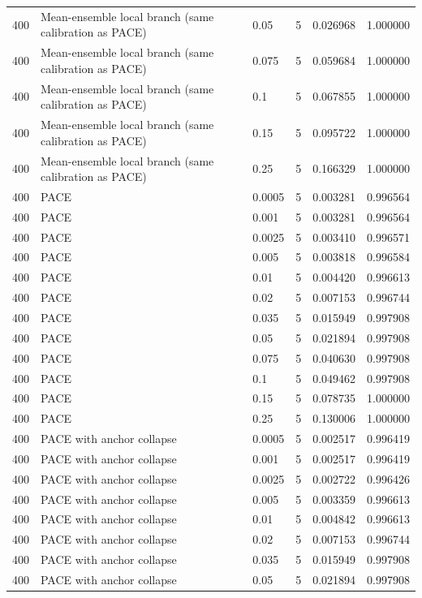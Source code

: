 \begin{tabular}{llllll}
400 & Mean-ensemble local branch (same calibration as PACE) & 0.05 & 5 & 0.026968 & 1.000000 \\
400 & Mean-ensemble local branch (same calibration as PACE) & 0.075 & 5 & 0.059684 & 1.000000 \\
400 & Mean-ensemble local branch (same calibration as PACE) & 0.1 & 5 & 0.067855 & 1.000000 \\
400 & Mean-ensemble local branch (same calibration as PACE) & 0.15 & 5 & 0.095722 & 1.000000 \\
400 & Mean-ensemble local branch (same calibration as PACE) & 0.25 & 5 & 0.166329 & 1.000000 \\
400 & PACE & 0.0005 & 5 & 0.003281 & 0.996564 \\
400 & PACE & 0.001 & 5 & 0.003281 & 0.996564 \\
400 & PACE & 0.0025 & 5 & 0.003410 & 0.996571 \\
400 & PACE & 0.005 & 5 & 0.003818 & 0.996584 \\
400 & PACE & 0.01 & 5 & 0.004420 & 0.996613 \\
400 & PACE & 0.02 & 5 & 0.007153 & 0.996744 \\
400 & PACE & 0.035 & 5 & 0.015949 & 0.997908 \\
400 & PACE & 0.05 & 5 & 0.021894 & 0.997908 \\
400 & PACE & 0.075 & 5 & 0.040630 & 0.997908 \\
400 & PACE & 0.1 & 5 & 0.049462 & 0.997908 \\
400 & PACE & 0.15 & 5 & 0.078735 & 1.000000 \\
400 & PACE & 0.25 & 5 & 0.130006 & 1.000000 \\
400 & PACE with anchor collapse & 0.0005 & 5 & 0.002517 & 0.996419 \\
400 & PACE with anchor collapse & 0.001 & 5 & 0.002517 & 0.996419 \\
400 & PACE with anchor collapse & 0.0025 & 5 & 0.002722 & 0.996426 \\
400 & PACE with anchor collapse & 0.005 & 5 & 0.003359 & 0.996613 \\
400 & PACE with anchor collapse & 0.01 & 5 & 0.004842 & 0.996613 \\
400 & PACE with anchor collapse & 0.02 & 5 & 0.007153 & 0.996744 \\
400 & PACE with anchor collapse & 0.035 & 5 & 0.015949 & 0.997908 \\
400 & PACE with anchor collapse & 0.05 & 5 & 0.021894 & 0.997908 \\

\end{tabular}
